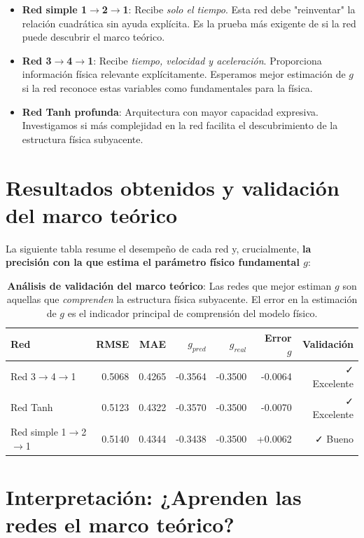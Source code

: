 \documentclass[11pt]{article}
\begin{document}
\begin{itemize}
    \item \textbf{Red simple 1$\rightarrow$2$\rightarrow$1}: Recibe \textit{solo el tiempo}. Esta red debe "reinventar" la relación cuadrática sin ayuda explícita. Es la prueba más exigente de si la red puede descubrir el marco teórico.
    \item \textbf{Red 3$\rightarrow$4$\rightarrow$1}: Recibe \textit{tiempo, velocidad y aceleración}. Proporciona información física relevante explícitamente. Esperamos mejor estimación de $g$ si la red reconoce estas variables como fundamentales para la física.
    \item \textbf{Red Tanh profunda}: Arquitectura con mayor capacidad expresiva. Investigamos si más complejidad en la red facilita el descubrimiento de la estructura física subyacente.
\end{itemize}

\section{Resultados obtenidos y validación del marco teórico}
La siguiente tabla resume el desempeño de cada red y, crucialmente, \textbf{la precisión con la que estima el parámetro físico fundamental $g$}:

\begin{table}[h]
\centering
\begin{tabular}{lrrrrrr}
\toprule
Red & RMSE & MAE & $g_{pred}$ & $g_{real}$ & Error $g$ & Validación \\
\midrule
Red 3$\rightarrow$4$\rightarrow$1 & 0.5068 & 0.4265 & -0.3564 & -0.3500 & -0.0064 & ✓ Excelente \\
Red Tanh & 0.5123 & 0.4322 & -0.3570 & -0.3500 & -0.0070 & ✓ Excelente \\
Red simple 1$\rightarrow$2$\rightarrow$1 & 0.5140 & 0.4344 & -0.3438 & -0.3500 & +0.0062 & ✓ Bueno \\
\bottomrule
\end{tabular}
\caption{\textbf{Análisis de validación del marco teórico}: Las redes que mejor estiman $g$ son aquellas que \textit{comprenden} la estructura física subyacente. El error en la estimación de $g$ es el indicador principal de comprensión del modelo físico.}
\label{tab:validation}
\end{table}

\section{Interpretación: ¿Aprenden las redes el marco teórico?}
\end{document}
